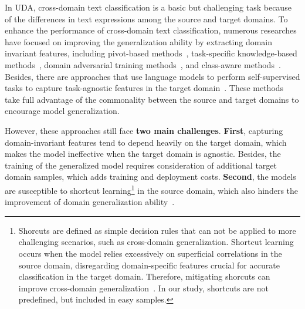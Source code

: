 \documentclass[letterpaper]{article} %
\begin{document}
In UDA, cross-domain text classification is a basic but challenging task because of the differences in text expressions among the source and target domains. To enhance the performance of cross-domain text classification, numerous researches have focused on improving the generalization ability by extracting domain invariant features, including pivot-based methods~\cite{ZiserR18, ZhangHPJ18, Ben-DavidRR20}, task-specific knowledge-based methods~\cite{ZhouTWWXH20}, domain adversarial training methods~\cite{WuS22}, and class-aware methods~\cite{YeTHLNB20, LuoGL022}. Besides, there are approaches that use language models to perform self-supervised tasks to capture task-agnostic features in the target domain~\cite{KarouzosPP21}. These methods take full advantage of the commonality between the source and target domains to encourage model generalization.

However, these approaches still face \textbf{two main challenges}. \textbf{First}, capturing domain-invariant features tend to depend heavily on the target domain, which makes the model ineffective when the target domain is agnostic. Besides, the training of the generalized model requires consideration of additional target domain samples, which adds training and deployment costs. \textbf{Second}, the models are susceptible to shortcut learning\footnote{Shorcuts are defined as simple decision rules that can not be applied to more challenging scenarios, such as cross-domain generalization. Shortcut learning occurs when the model relies excessively on superficial correlations in the source domain, disregarding domain-specific features crucial for accurate classification in the target domain. Therefore, mitigating shorcuts can improve cross-domain generalization~\cite{MoonMLLS21}. In our study, shortcuts are not predefined, but included in easy samples. } in the source domain, which also hinders the improvement of domain generalization ability~\cite{GeirhosJMZBBW20, Yunlong2023}.
\end{document}

